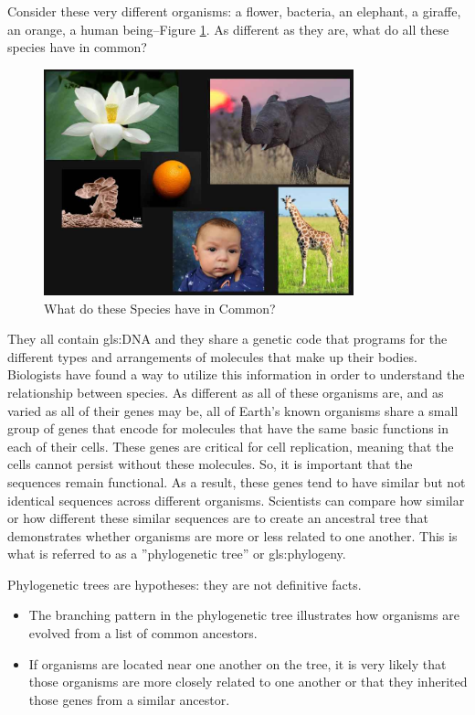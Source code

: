 \documentclass[]{article}
\begin{document}
Consider these very different organisms: a flower, bacteria, an elephant, a giraffe, an orange, a human being--Figure \ref{fig:WhatDoTheseSpeciesHaveInCommon}.
As different as they are, what do all these species have in common?
\begin{figure}[H]
	\begin{center}
		\caption{What do these Species have in Common?}\label{fig:WhatDoTheseSpeciesHaveInCommon}
		\includegraphics[width=0.8\textwidth]{WhatDoTheseSpeciesHaveInCommon}
	\end{center}
\end{figure}
They all contain \gls{gls:DNA}
and they share a genetic code
that programs for the different types
and arrangements of molecules
that make up their bodies.
Biologists have found a way
to utilize this information
in order to understand
the relationship between species.
As different as
all of these organisms are,
and as varied as
all of their genes may be,
all of Earth's known organisms
share a small group of genes
that encode for molecules
that have the same basic functions
in each of their cells.
These genes are critical
for cell replication,
meaning that the cells cannot persist
without these molecules.
So, it is important that
the sequences remain functional.
As a result, these genes tend to have
similar but not identical sequences
across different organisms.
Scientists can compare how similar or how different these similar sequences are to create an ancestral tree that demonstrates whether organisms are more or less related to one another.
This is what is referred to as a ''phylogenetic tree'' or \gls{gls:phylogeny}.

Phylogenetic trees are hypotheses: they are not definitive facts.
\begin{itemize}
	\item The branching pattern	in the phylogenetic tree illustrates how organisms are evolved from a list of common ancestors.
	
	\item If organisms are located 	near one another on the tree, 	it is very likely that those organisms are more closely related to one another or that they inherited those genes from a similar ancestor.
\end{itemize}
\end{document}
